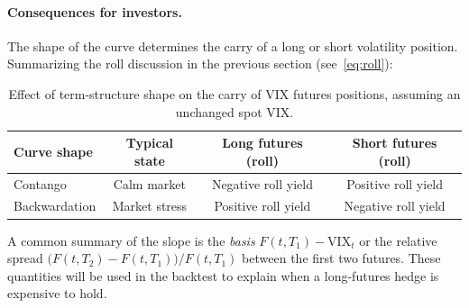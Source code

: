 \paragraph{Consequences for investors.} The shape of the curve determines the carry of a long or short volatility position. Summarizing the roll discussion in the previous section (see~\eqref{eq:roll}):

\begin{table}[htbp]
\centering
\small
\begin{tabular}{@{}lccc@{}}
\toprule
\textbf{Curve shape} & \textbf{Typical state} & \textbf{Long futures (roll)} & \textbf{Short futures (roll)}\\
\midrule
Contango & Calm market & Negative roll yield & Positive roll yield\\
Backwardation & Market stress & Positive roll yield & Negative roll yield\\
\bottomrule
\end{tabular}
\caption{Effect of term-structure shape on the carry of VIX futures positions, assuming an unchanged spot VIX.}
\label{tab:roll-summary}
\end{table}

A common summary of the slope is the \emph{basis} $F(t,T_1)-\text{VIX}_t$ or the relative spread $\big(F(t,T_2)-F(t,T_1)\big)/F(t,T_1)$ between the first two futures. These quantities will be used in the backtest to explain when a long-futures hedge is expensive to hold.
